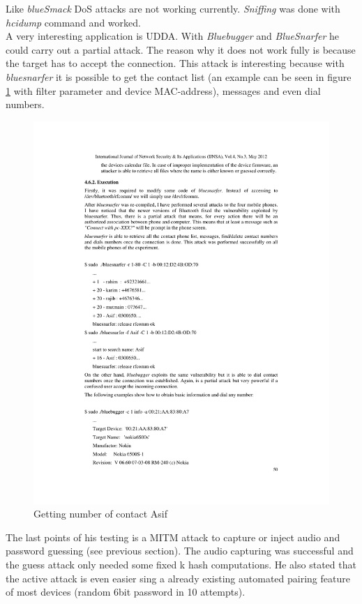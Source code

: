 \documentclass[12pt,a4paper]{article}
\begin{document}
Like \emph{blueSmack} DoS attacks are not working currently. \emph{Sniffing} was done with \emph{hcidump} command and worked.\\
A very interesting application is UDDA. With \emph{Bluebugger} and \emph{BlueSnarfer} he could carry out a partial attack. The reason why it does not work fully is because the target has to accept the connection. This attack is interesting because with \emph{bluesnarfer} it is possible to get the contact list (an example can be seen in figure \ref{img_bt_attack_bluesnarfer} with filter parameter and device MAC-address), messages and even dial numbers.
\begin{figure}[h]
\begin{center}
\includegraphics{img/bluesnarfer.pdf}
\caption{Getting number of contact Asif  \cite{DBLP:journals/corr/abs-1206-1482}}
\label{img_bt_attack_bluesnarfer}
\end{center}
\end{figure}
The last points of his testing is a MITM attack to capture or inject audio and password guessing (see previous section). The audio capturing was successful and the guess attack only needed some fixed k hash computations. He also stated that the active attack is even easier sing a already existing automated pairing feature of most devices (random 6bit password in 10 attempts).\\
\end{document}
